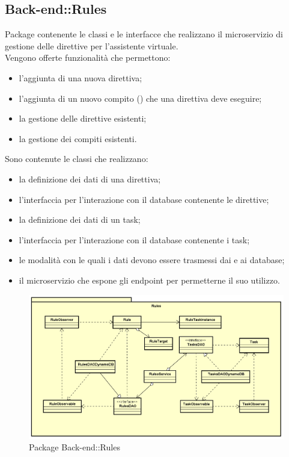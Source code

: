 \subsection{Back-end::Rules}
Package contenente le classi e le interfacce che realizzano il microservizio di gestione delle direttive per l'assistente virtuale.\\ Vengono offerte funzionalità che permettono: \begin{itemize} \item l'aggiunta di una nuova direttiva; \item l'aggiunta di un nuovo compito () che una direttiva deve eseguire; \item la gestione delle direttive esistenti; \item la gestione dei compiti esistenti. \end{itemize} Sono contenute le classi che realizzano: \begin{itemize} \item la definizione dei dati di una direttiva; \item l'interfaccia per l'interazione con il database contenente le direttive; \item la definizione dei dati di un task; \item l'interfaccia per l'interazione con il database contenente i task; \item le modalità con le quali i dati devono essere trasmessi dai e ai database; \item il microservizio che espone gli endpoint per permetterne il suo utilizzo. \end{itemize}
\begin{figure}[h] \centering \includegraphics[width=\textwidth,height=\textheight,keepaspectratio]{images/diagrams/back-end/Official_Backend_0304/Rules.png}
	\caption{Package Back-end::Rules}
\end{figure}
\newpage

